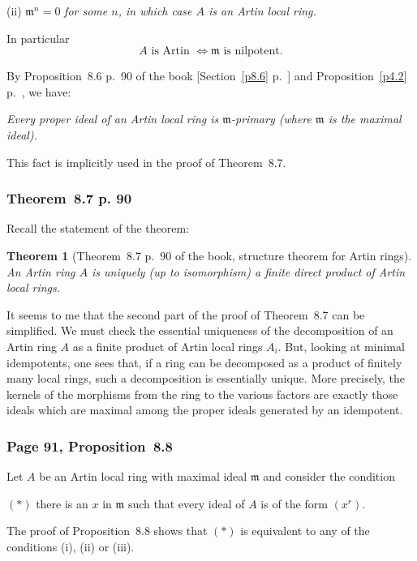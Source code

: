 \documentclass[12pt,letterpaper]{article}%
\newcommand{\mf}{\mathfrak}
\newcommand{\mmm}{\mf m}
\newcommand{\nn}{\noindent}
\newtheorem{thm}{Theorem}%
\begin{document}
\nn(ii) $\mmm^n=0$ \emph{for some $n$, in which case $A$ is an Artin local ring.}

In particular 
\begin{equation}\label{86}
A\text{ is Artin $\iff\mmm$ is nilpotent.}
\end{equation} 

By Proposition~8.6 p.~90 of the book [Section~\ref{p8.6} p.~\pageref{p8.6}] and Proposition~\ref{p4.2} p.~\pageref{p4.2}, we have:

\nn\emph{Every proper ideal of an Artin local ring is $\mmm$-primary (where $\mmm$ is the maximal ideal).} 

This fact is implicitly used in the proof of Theorem~8.7.

\subsubsection{Theorem~8.7 p. 90}

Recall the statement of the theorem:

\begin{thm}[Theorem~8.7 p.~90 of the book, structure theorem for Artin rings]\label{t8.7}
An Artin ring $A$ is uniquely (up to isomorphism) a finite direct product of Artin local rings.
\end{thm}

It seems to me that the second part of the proof of Theorem~8.7 can be simplified. We must check the essential uniqueness of the decomposition of an Artin ring $A$ as a finite product of Artin local rings $A_i$. But, looking at minimal idempotents, one sees that, if a ring can be decomposed as a product of finitely many local rings, such a decomposition is essentially unique. More precisely, the kernels of the morphisms from the ring to the various factors are exactly those ideals which are maximal among the proper ideals generated by an idempotent.

\subsubsection{Page 91, Proposition~8.8}%

Let $A$ be an Artin local ring with maximal ideal $\mmm$ and consider the condition

$(*)$ there is an $x$ in $\mmm$ such that every ideal of $A$ is of the form $(x^r)$. 

\nn The proof of Proposition~8.8 shows that $(*)$ is equivalent to any of the conditions (i), (ii) or (iii).
\end{document}

